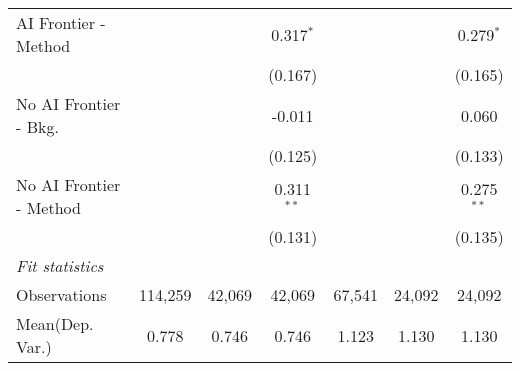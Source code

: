 \begin{tabular}{lcccccc}
   AI Frontier - Method    &               &               & 0.317$^{*}$   &               &              & 0.279$^{*}$\\   
                           &               &               & (0.167)       &               &              & (0.165)\\   
   No AI Frontier - Bkg.   &               &               & -0.011        &               &              & 0.060\\   
                           &               &               & (0.125)       &               &              & (0.133)\\   
   No AI Frontier - Method &               &               & 0.311$^{**}$  &               &              & 0.275$^{**}$\\   
                           &               &               & (0.131)       &               &              & (0.135)\\   
   \midrule
   \emph{Fit statistics}\\
   Observations            & 114,259       & 42,069        & 42,069        & 67,541        & 24,092       & 24,092\\  
Mean(Dep. Var.) & 0.778 & 0.746 & 0.746 & 1.123 & 1.130 & 1.130 \\
   

\end{tabular}
